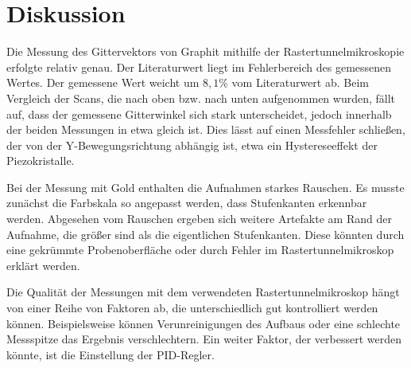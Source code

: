 \section{Diskussion}

Die Messung des Gittervektors von Graphit mithilfe der Rastertunnelmikroskopie erfolgte relativ genau.
Der Literaturwert liegt im Fehlerbereich des gemessenen Wertes.
Der gemessene Wert weicht um $8,1\%$ vom Literaturwert ab.
Beim Vergleich der Scans, die nach oben bzw. nach unten aufgenommen wurden, fällt auf, dass der gemessene Gitterwinkel sich stark unterscheidet, jedoch innerhalb der beiden Messungen in etwa gleich ist.
Dies lässt auf einen Messfehler schließen, der von der Y-Bewegungsrichtung abhängig ist, etwa ein Hystereseeffekt der Piezokristalle.

Bei der Messung mit Gold enthalten die Aufnahmen starkes Rauschen.
Es musste zunächst die Farbskala so angepasst werden, dass Stufenkanten erkennbar werden.
Abgesehen vom Rauschen ergeben sich weitere Artefakte am Rand der Aufnahme, die größer sind als die eigentlichen Stufenkanten.
Diese könnten durch eine gekrümmte Probenoberfläche oder durch Fehler im Rastertunnelmikroskop erklärt werden.

Die Qualität der Messungen mit dem verwendeten Rastertunnelmikroskop hängt von einer Reihe von Faktoren ab, die unterschiedlich gut kontrolliert werden können.
Beispielsweise können Verunreinigungen des Aufbaus oder eine schlechte Messspitze das Ergebnis verschlechtern.
Ein weiter Faktor, der verbessert werden könnte, ist die Einstellung der PID-Regler.